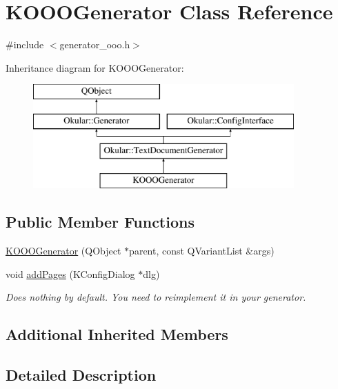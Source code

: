 \hypertarget{classKOOOGenerator}{\section{K\+O\+O\+O\+Generator Class Reference}
\label{classKOOOGenerator}
}


{\ttfamily \#include $<$generator\+\_\+ooo.\+h$>$}

Inheritance diagram for K\+O\+O\+O\+Generator\+:\begin{figure}[H]
\begin{center}
\leavevmode
\includegraphics[height=4.000000cm]{classKOOOGenerator}
\end{center}
\end{figure}
\subsection*{Public Member Functions}
\begin{DoxyCompactItemize}
\item 
\hyperlink{classKOOOGenerator_a98e2b0d9cd7836b30156b5b0e6ef47e6}{K\+O\+O\+O\+Generator} (Q\+Object $\ast$parent, const Q\+Variant\+List \&args)
\item 
void \hyperlink{classKOOOGenerator_afcf312689c8cfc2f6773befcffedb594}{add\+Pages} (K\+Config\+Dialog $\ast$dlg)
\begin{DoxyCompactList}\small\item\em Does nothing by default. You need to reimplement it in your generator. \end{DoxyCompactList}\end{DoxyCompactItemize}
\subsection*{Additional Inherited Members}


\subsection{Detailed Description}


